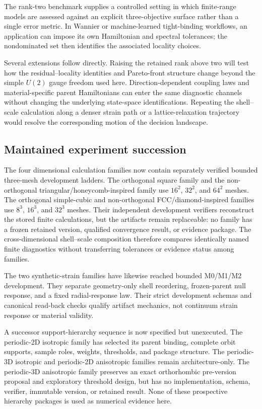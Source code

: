 \documentclass[11pt]{article}
\begin{document}
The rank-two benchmark supplies a controlled setting in which finite-range models are
assessed against an explicit three-objective surface rather than a single error metric.
In Wannier or machine-learned tight-binding workflows, an application can impose its own
Hamiltonian and spectral tolerances; the nondominated set then identifies the associated
locality choices.

Several extensions follow directly. Raising the retained rank above two will test how
the residual--locality identities and Pareto-front structure change beyond the simple
$U(2)$ gauge freedom used here. Direction-dependent coupling laws and material-specific
parent Hamiltonians can enter the same diagnostic channels without changing the
underlying state-space identifications. Repeating the shell--scale calculation along a
denser strain path or a lattice-relaxation trajectory would resolve the corresponding
motion of the decision landscape.

\subsection{Maintained experiment succession}

The four dimensional calculation families now contain separately verified bounded
three-mesh development ladders. The orthogonal square family and the non-orthogonal
triangular/honeycomb-inspired family use $16^2$, $32^2$, and $64^2$ meshes. The
orthogonal simple-cubic and non-orthogonal FCC/diamond-inspired families use $8^3$,
$16^3$, and $32^3$ meshes. Their independent development verifiers reconstruct the
stored finite calculations, but the artifacts remain replaceable: no family has a
frozen retained version, qualified convergence result, or evidence package. The
cross-dimensional shell--scale composition therefore compares identically named
finite diagnostics without transferring tolerances or evidence status among families.

The two synthetic-strain families have likewise reached bounded M0/M1/M2 development.
They separate geometry-only shell reordering, frozen-parent null response, and a fixed
radial-response law. Their strict development schemas and canonical read-back checks
qualify artifact mechanics, not continuum strain response or material validity.

A successor support-hierarchy sequence is now specified but unexecuted. The periodic-2D
isotropic family has selected its parent binding, complete orbit supports, sample roles,
weights, thresholds, and package structure. The periodic-3D isotropic and periodic-2D
anisotropic families remain architecture-only. The periodic-3D anisotropic family
preserves an exact orthorhombic pre-version proposal and exploratory threshold design,
but has no implementation, schema, verifier, immutable version, or retained result.
None of these prospective hierarchy packages is used as numerical evidence here.
\end{document}
